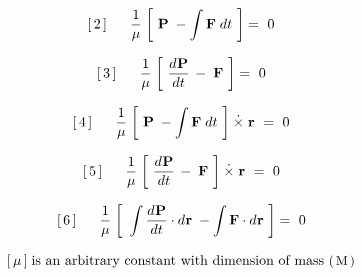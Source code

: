 \documentclass[10pt,fleqn]{article}
\begin{document}
\par \vspace{+0.15em}
\begin{eqnarray*}
\hspace{+1.35em} [\,2\,] \;\;\;\;\;\; \dfrac{1}{\mu} \; \bigg [ \,\, \mathbf{P} \; - \int \mathbf{F} \; d\hspace{+0.012em}t \,\, \bigg ] =~ 0
\end{eqnarray*}
\par \vspace{+0.15em}
\begin{eqnarray*}
\hspace{+1.35em} [\,3\,] \;\;\;\;\;\; \dfrac{1}{\mu} \; \bigg [ \,\, \dfrac{d\hspace{+0.045em}\mathbf{P}}{d\hspace{+0.012em}t} \, - \; \mathbf{F} \,\, \bigg ] =~ 0
\end{eqnarray*}
\par \vspace{+0.15em}
\begin{eqnarray*}
\hspace{+1.35em} [\,4\,] \;\;\;\;\;\; \dfrac{1}{\mu} \; \bigg [ \,\, \mathbf{P} \; - \int \mathbf{F} \; d\hspace{+0.012em}t \,\, \bigg ] \hspace{+0.24em}\dot{\times}\hspace{+0.30em} \mathbf{r} ~=~ 0
\end{eqnarray*}
\par \vspace{+0.15em}
\begin{eqnarray*}
\hspace{+1.35em} [\,5\,] \;\;\;\;\;\; \dfrac{1}{\mu} \; \bigg [ \,\, \dfrac{d\hspace{+0.045em}\mathbf{P}}{d\hspace{+0.012em}t} \, - \; \mathbf{F} \,\, \bigg ] \hspace{+0.24em}\dot{\times}\hspace{+0.30em} \mathbf{r} ~=~ 0
\end{eqnarray*}
\par \vspace{+0.15em}
\begin{eqnarray*}
\hspace{+1.35em} [\,6\,] \;\;\;\;\;\; \dfrac{1}{\mu} \; \bigg [ \,\, \int \dfrac{d\hspace{+0.045em}\mathbf{P}}{d\hspace{+0.012em}t} \cdot d\hspace{+0.036em}\mathbf{r} \; - \int \mathbf{F} \cdot d\hspace{+0.036em}\mathbf{r} \,\, \bigg ] =~ 0
\end{eqnarray*}
\par \vspace{+0.33em}
\begin{eqnarray*}
\hspace{+1.35em} [\,\mu\,] \; \textrm{is an arbitrary constant with dimension of mass {\small $( \, \mathrm{M} \, )$}}
\end{eqnarray*}
\end{document}
